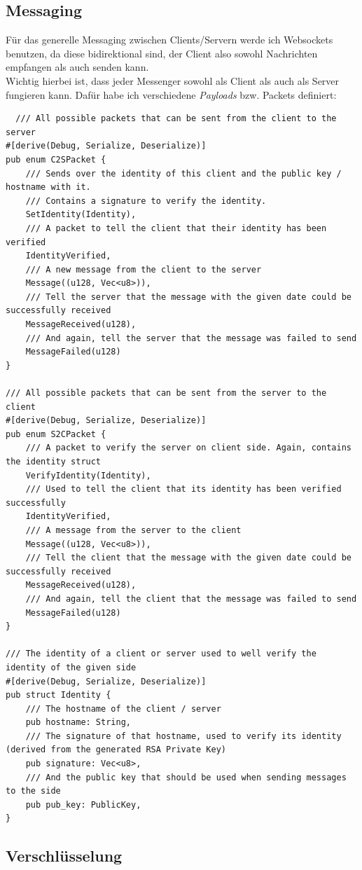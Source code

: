 \documentclass[a4paper,ngerman, headheight=28pt,12pt]{scrartcl}
\begin{document}
\subsection{Messaging}
Für das generelle Messaging zwischen Clients/Servern werde ich Websockets benutzen, da diese bidirektional sind, der Client also sowohl Nachrichten empfangen als auch senden kann. \\
Wichtig hierbei ist, dass jeder Messenger sowohl als Client als auch als Server fungieren kann. Dafür habe ich verschiedene \textit{Payloads} bzw. Packets definiert:
\begin{verbatim}
  /// All possible packets that can be sent from the client to the server
#[derive(Debug, Serialize, Deserialize)]
pub enum C2SPacket {
    /// Sends over the identity of this client and the public key / hostname with it.
    /// Contains a signature to verify the identity.
    SetIdentity(Identity),
    /// A packet to tell the client that their identity has been verified
    IdentityVerified,
    /// A new message from the client to the server
    Message((u128, Vec<u8>)),
    /// Tell the server that the message with the given date could be successfully received
    MessageReceived(u128),
    /// And again, tell the server that the message was failed to send
    MessageFailed(u128)
}

/// All possible packets that can be sent from the server to the client
#[derive(Debug, Serialize, Deserialize)]
pub enum S2CPacket {
    /// A packet to verify the server on client side. Again, contains the identity struct
    VerifyIdentity(Identity),
    /// Used to tell the client that its identity has been verified successfully
    IdentityVerified,
    /// A message from the server to the client
    Message((u128, Vec<u8>)),
    /// Tell the client that the message with the given date could be successfully received
    MessageReceived(u128),
    /// And again, tell the client that the message was failed to send
    MessageFailed(u128)
}

/// The identity of a client or server used to well verify the identity of the given side
#[derive(Debug, Serialize, Deserialize)]
pub struct Identity {
    /// The hostname of the client / server
    pub hostname: String,
    /// The signature of that hostname, used to verify its identity (derived from the generated RSA Private Key)
    pub signature: Vec<u8>,
    /// And the public key that should be used when sending messages to the side
    pub pub_key: PublicKey,
}
\end{verbatim}
\subsection{Verschlüsselung}
\end{document}
